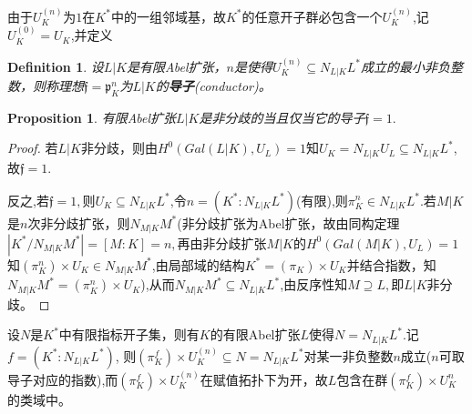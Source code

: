 \documentclass[UTF8]{article}
\newtheorem{defn}{Definition}[section]
\newtheorem{prop}{Proposition}[section]
\begin{document}
由于$U_{K}^{(n)}$为$1$在$K^{*}$中的一组邻域基，故$K^{*}$的任意开子群必包含一个$U_{K}^{(n)}$,记$U_{K}^{(0)}=U_{K}$,并定义
\begin{defn}
	设$L|K$是有限Abel扩张，$n$是使得$U_{K}^{(n)}\subseteq N_{L|K}L^{*}$成立的最小非负整数，则称理想$\mathfrak{f}=\mathfrak{p}_{K}^{n}$为$L|K$的\textbf{导子}(conductor)。
\end{defn}
\begin{prop}
	有限Abel扩张$L|K$是非分歧的当且仅当它的导子$\mathfrak{f}=1.$
\end{prop}
\begin{proof}
	若$L|K$非分歧，则由$H^{0}(Gal(L|K),U_{L})=1$知$U_{K}=N_{L|K}U_{L}\subseteq N_{L|K}L^{*}$,故$\mathfrak{f}=1.$
	
	反之,若$\mathfrak{f}=1,$则$U_{K}\subseteq N_{L|K}L^{*}$,令$n=(K^{*}:N_{L|K}L^{*})$(有限),则$\pi_{K}^{n}\in N_{L|K}L^{*}$.若$M|K$是$n$次非分歧扩张，则$N_{M|K}M^{*}$(非分歧扩张为Abel扩张，故由同构定理$|K^{*}/N_{M|K}M^{*}|=[M:K]=n,$再由非分歧扩张$M|K$的$H^{0}(Gal(M|K),U_{L})=1$知$(\pi_{K}^{n})\times U_{K}\in N_{M|K}M^{*}$,由局部域的结构$K^{*}=(\pi_{K})\times U_{K}$并结合指数，知$N_{M|K}M^{*}=(\pi_{K}^{n})\times U_{K}$),从而$N_{M|K}M^{*}\subseteq N_{L|K}L^{*}$,由反序性知$M\supseteq L,$即$L|K$非分歧。
\end{proof}
设$N$是$K^{*}$中有限指标开子集，则有$K$的有限Abel扩张$L$使得$N=N_{L|K}L^{*}$.记$f=(K^{*}:N_{L|K}L^{*})$,
则$(\pi_{K}^{f})\times U_{K}^{(n)}\subseteq N=N_{L|K}L^{*}$对某一非负整数$n$成立($n$可取导子对应的指数),而$(\pi_{K}^{f})\times U_{K}^{(n)}$在赋值拓扑下为开，故$L$包含在群$(\pi_{K}^{f})\times U_{K}^{n}$的类域中。
\end{document}

